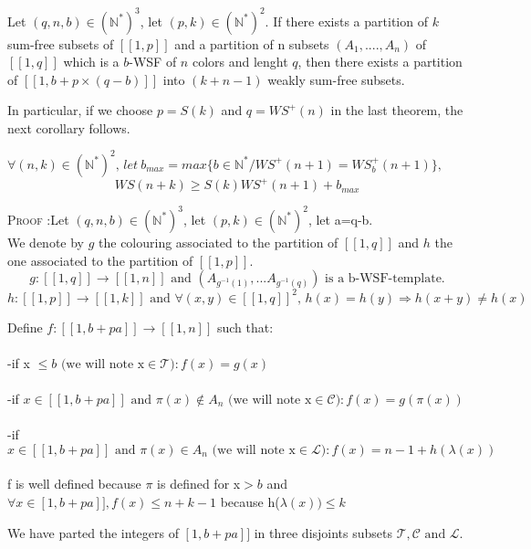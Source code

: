 \begin{theorem}
Let \((q,n,b) \in (\mathbb{N}^*)^3\), let \( (p,k) \in (\mathbb{N}^*)^2\). If there exists a partition of \(k\)
sum-free subsets of \([\![1,p]\!]\) and a partition of n subsets \((A_1,....,A_n)\) of \([\![1, q]\!]\) which is a
\(b\)-WSF of \(n\) colors and lenght \(q\),
 then there exists a partition of \([\![1, b+p \times (q-b)]\!]\) into \((k+n-1)\) weakly sum-free subsets.
\end{theorem}

In particular, if we choose \(p = S(k)\) and \(q = WS^+(n)\) in the last theorem, the next corollary follows.


\begin{corollary}
\( \forall (n,k) \in (\mathbb{N}^*)^2 \text{, } let ~ b_{max}=max \{b\in \mathbb{N}^*/WS^+(n+1)=WS_b^+(n+1)\},\) \[
WS(n+k) \geqslant S(k) WS^+(n+1)+b_{max}\]
\end{corollary}


\textsc{Proof :}Let \((q,n,b) \in (\mathbb{N}^*)^3\), let \( (p,k) \in (\mathbb{N}^*)^2\), let a=q-b. \\
We denote by \(g\) the colouring associated to the partition of \([\![1,q]\!]\) and \(h\) the
one associated to the partition of \([\![1,p]\!]\).
\[ g : [\![1,q]\!] \longrightarrow [\![1,n]\!] \text{ and } (A_{g^{-1}(1)},...A_{g^{-1}(q)})\text{ is a b-WSF-template.}
\]
\[h : [\![1,p]\!] \longrightarrow [\![1,k]\!] \text{ and } \forall (x,y) \in [\![1,q]\!]^2 \text{, } h(x) = h(y)
\Longrightarrow h(x+y) \neq h(x)
\]

Define \( f : [\![1,b+pa]\!] \longrightarrow [\![1,n]\!] \) such that:
\\\\-if x \(\leqslant b \text{ (we will note x} \in \mathcal{T}): f(x)=g(x)\)
\\\\-if \( x \in [\![1,b+pa]\!] \text{ and } \pi(x) \notin A_n \text{ (we will note x} \in \mathcal{C}): f(x)=g(\pi(x))\)
\\\\-if \( x \in [\![1,b+pa]\!]  \text{ and }\pi(x) \in A_n \text{ (we will note x} \in \mathcal{L}): f(x)=n-1+h(\lambda(x))\)
\\\\
f is well defined because \(\pi\) is defined for x\(>b\) and \(\forall x \in \![1,b+pa]\!], f(x)\leqslant n+k-1\) because h(\(\lambda(x))\leqslant k\)

We have parted the integers of \(\![1,b+pa]\!]\) in three disjoints subsets \(\mathcal{T},\mathcal{C} \text{ and } \mathcal{L}\).

